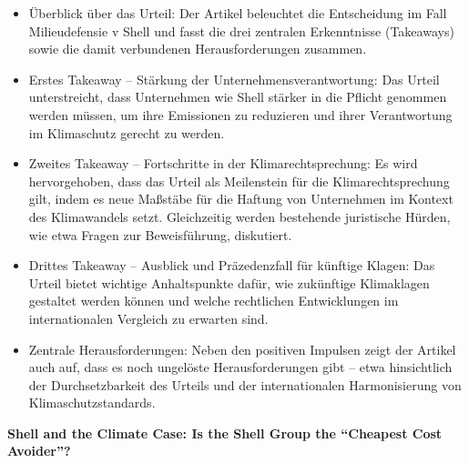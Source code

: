 \documentclass[a4paper, 12pt]{article} %
\begin{document}
 \begin{itemize}
   \item Überblick über das Urteil: Der Artikel beleuchtet die Entscheidung im Fall Milieudefensie v Shell und fasst die drei zentralen Erkenntnisse (Takeaways) sowie die damit verbundenen Herausforderungen zusammen.
   \item Erstes Takeaway – Stärkung der Unternehmensverantwortung: Das Urteil unterstreicht, dass Unternehmen wie Shell stärker in die Pflicht genommen werden müssen, um ihre Emissionen zu reduzieren und ihrer Verantwortung im Klimaschutz gerecht zu werden.
   \item Zweites Takeaway – Fortschritte in der Klimarechtsprechung: Es wird hervorgehoben, dass das Urteil als Meilenstein für die Klimarechtsprechung gilt, indem es neue Maßstäbe für die Haftung von Unternehmen im Kontext des Klimawandels setzt. Gleichzeitig werden bestehende juristische Hürden, wie etwa Fragen zur Beweisführung, diskutiert.
   \item Drittes Takeaway – Ausblick und Präzedenzfall für künftige Klagen: Das Urteil bietet wichtige Anhaltspunkte dafür, wie zukünftige Klimaklagen gestaltet werden können und welche rechtlichen Entwicklungen im internationalen Vergleich zu erwarten sind.
   \item Zentrale Herausforderungen: Neben den positiven Impulsen zeigt der Artikel auch auf, dass es noch ungelöste Herausforderungen gibt – etwa hinsichtlich der Durchsetzbarkeit des Urteils und der internationalen Harmonisierung von Klimaschutzstandards.
 \end{itemize}
 
\textbf{\cite{Kanning_2024} Shell and the Climate Case: {{Is}} the Shell Group the “Cheapest Cost Avoider”?}
\end{document}
